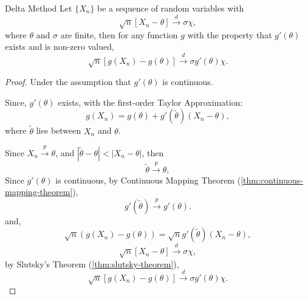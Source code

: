 \begin{theorem}{Delta Method}{}
    Let $\{X_{n}\}$ be a sequence of random variables with
    \begin{equation*}
        \sqrt{n}\left[X_{n}-\theta\right] \stackrel{d}{\rightarrow}\sigma\chi,
    \end{equation*}
    where $\theta$ and $\sigma$ are finite, then for any function $g$ with the property that $g'(\theta)$ exists and is non-zero valued,
    \begin{equation*}
        \sqrt{n}\left[g\left(X_{n}\right)-g(\theta)\right] \stackrel{d}{\rightarrow} \sigma g'(\theta)\chi.
    \end{equation*}
\end{theorem}

\begin{proof}
    Under the assumption that $g'(\theta)$ is continuous.

    Since, $g'(\theta)$ exists, with the first-order Taylor Approximation:
    \begin{equation*}
        g(X_n)=g(\theta)+g'(\tilde{\theta})(X_n-\theta),
    \end{equation*}
    where $\tilde{\theta}$ lies between $X_n$ and $\theta$.

    Since $X_n\stackrel{p}{\rightarrow}\theta$, and $|\tilde{\theta}-\theta|<|X_n-\theta|$, then
    \begin{equation*}
        \tilde{\theta}\stackrel{p}{\rightarrow}\theta,
    \end{equation*}
    Since $g'(\theta)$   is continuous, by Continuous Mapping Theorem (\ref{thm:continuous-mapping-theorem}),
    \begin{equation*}
        g'(\tilde{\theta})\stackrel{p}{\rightarrow}g'(\theta).
    \end{equation*}
    and,
    \begin{equation*}
        \sqrt{n}\left(g(X_n)-g(\theta)\right)=\sqrt{n}g'(\tilde{\theta})(X_n-\theta),
    \end{equation*}
    \begin{equation*}
        \sqrt{n}\left[X_{n}-\theta\right] \stackrel{d}{\rightarrow}\sigma\chi,
    \end{equation*}
    by Slutsky's Theorem (\ref{thm:slutsky-theorem}),
    \begin{equation*}
        \sqrt{n}\left[g\left(X_{n}\right)-g(\theta)\right] \stackrel{d}{\rightarrow} \sigma g'(\theta)\chi.
    \end{equation*}
\end{proof}

